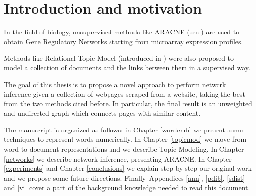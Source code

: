 \chapter{Introduction and motivation}

In the field of biology, unsupervised methods like ARACNE (see \cite{DBLP:journals/bmcbi/MargolinNBWSFC06}) 
are used to obtain Gene Regulatory Networks starting from microarray expression profiles. 

Methods like Relational Topic Model (introduced in \cite{pmlr-v5-chang09a}) were also proposed to 
model a collection of documents and the links between them in a supervised way. 

The goal of this thesis is to propose a novel approach to perform network inference given a collection of 
webpages scraped from a website, taking the best from the two methods cited before. 
In particular, the final result is an unweighted and undirected graph which connects pages with similar content.

The manuscript is organized as follows: 
in Chapter \ref{wordemb} we present some techniques to represent words numerically. 
In Chapter \ref{topicmod} we move from word to document representations and we describe Topic Modeling. 
In Chapter \ref{networks} we describe network inference, presenting ARACNE.
In Chapter \ref{experiments} and Chapter \ref{conclusions} we explain step-by-step our original work 
and we propose some future directions. 
Finally, Appendices \ref{ann}, \ref{pdib}, \ref{sdist} and \ref{vi} cover a part of the background knowledge needed to read this document.